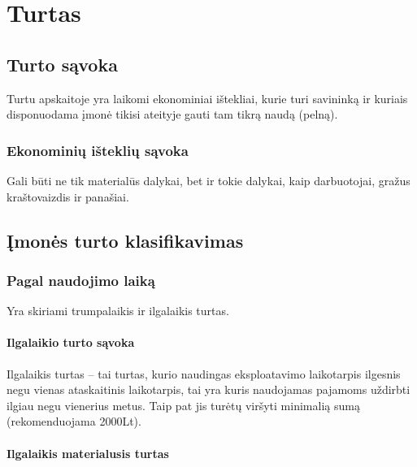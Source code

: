 \chapter{Turtas}


\section{Turto sąvoka}


Turtu apskaitoje yra laikomi ekonominiai ištekliai, kurie turi
savininką ir kuriais disponuodama įmonė tikisi ateityje gauti
tam tikrą naudą (pelną).

\subsection{Ekonominių išteklių sąvoka}


Gali būti ne tik materialūs dalykai, bet ir tokie dalykai, kaip
darbuotojai, gražus kraštovaizdis ir panašiai.

\section{Įmonės turto klasifikavimas}


\subsection{Pagal naudojimo laiką}


Yra skiriami trumpalaikis ir ilgalaikis turtas.

\subsubsection{Ilgalaikio turto sąvoka}


Ilgalaikis turtas – tai turtas, kurio naudingas eksploatavimo
laikotarpis ilgesnis negu vienas ataskaitinis laikotarpis,
tai yra kuris naudojamas pajamoms uždirbti ilgiau negu
vienerius metus. Taip pat jis turėtų viršyti minimalią sumą
(rekomenduojama 2000Lt).

\subsubsection{Ilgalaikis materialusis turtas}

